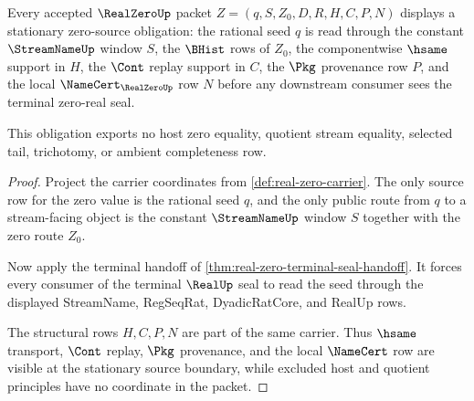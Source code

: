 \begin{theorem}
\label{thm:real-zero-stationary-source-obligation}
Every accepted $\RealZeroUp$ packet $Z=(q,S,Z_0,D,R,H,C,P,N)$ displays a stationary zero-source obligation: the rational seed $q$ is read through the constant $\StreamNameUp$ window $S$, the $\BHist$ rows of $Z_0$, the componentwise $\hsame$ support in $H$, the $\Cont$ replay support in $C$, the $\Pkg$ provenance row $P$, and the local $\NameCert_{\RealZeroUp}$ row $N$ before any downstream consumer sees the terminal zero-real seal.

This obligation exports no host zero equality, quotient stream equality, selected tail, trichotomy, or ambient completeness row.
\end{theorem}
\begin{proof}
Project the carrier coordinates from \autoref{def:real-zero-carrier}. The only source row for the zero value is the rational seed $q$, and the only public route from $q$ to a stream-facing object is the constant $\StreamNameUp$ window $S$ together with the zero route $Z_0$.

Now apply the terminal handoff of \autoref{thm:real-zero-terminal-seal-handoff}. It forces every consumer of the terminal $\RealUp$ seal to read the seed through the displayed StreamName, RegSeqRat, DyadicRatCore, and RealUp rows.

The structural rows $H,C,P,N$ are part of the same carrier. Thus $\hsame$ transport, $\Cont$ replay, $\Pkg$ provenance, and the local $\NameCert$ row are visible at the stationary source boundary, while excluded host and quotient principles have no coordinate in the packet.
\end{proof}

